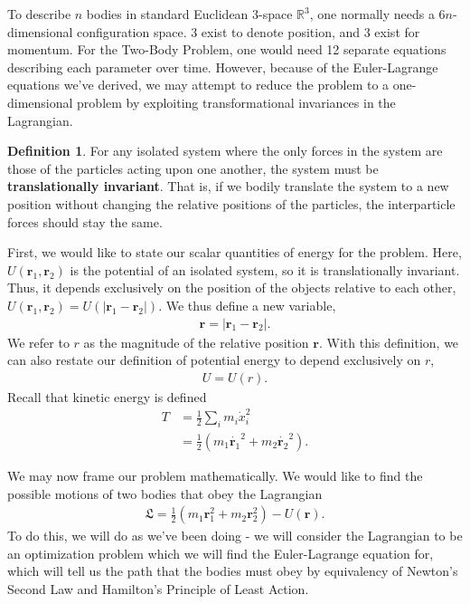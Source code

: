 \documentclass[10pt, psamsfonts]{amsart}
\theoremstyle{definition}
\newtheorem{defn}[thm]{Definition}
\theoremstyle{remark}
\numberwithin{equation}{section}
\begin{document}
To describe $n$ bodies in standard Euclidean 3-space $\mathbb{R}^3$, one normally needs a $6n$-dimensional configuration space. 3 exist to denote position, and 3 exist for momentum. For the Two-Body Problem, one would need 12 separate equations describing each parameter over time. However, because of the Euler-Lagrange equations we've derived, we may attempt to reduce the problem to a one-dimensional problem by exploiting transformational invariances in the Lagrangian.

\begin{defn}
  For any isolated system where the only forces in the system are those of the particles acting upon one another, the system must be \textbf{translationally invariant}. That is, if we bodily translate the system to a new position without changing the relative positions of the particles, the interparticle forces should stay the same.
\end{defn}

First, we would like to state our scalar quantities of energy for the problem. Here, $U(\bm{r}_1, \bm{r}_2)$ is the potential of an isolated system, so it is translationally invariant. Thus, it depends exclusively on the position of the objects relative to each other, $U(\bm{r}_1, \bm{r}_2) = U(|\bm{r}_1 - \bm{r}_2|) $. We thus define a new variable,
\begin{align*}
  \bm{r} = |\bm{r}_1 - \bm{r}_2|.
\end{align*}
We refer to $r$ as the magnitude of the relative position $\bm{r}$. With this definition, we can also restate our definition of potential energy to depend exclusively on $r$,
\begin{align*}
  U = U(r).
\end{align*}
Recall that kinetic energy is defined 
\begin{align*}
  T &= \frac{1}{2} \sum_i  m_i \dot{x}_i^2 \\
    &= \frac{1}{2} (m_1 \dot{\bm{r}_1}^2 + m_2 \dot{\bm{r}_2}^2).
\end{align*}

We may now frame our problem mathematically. We would like to find the possible motions of two bodies that obey the Lagrangian
\begin{gather*}
  \mathfrak{L} = \frac{1}{2} (m_1 \bm{r}_1^2 + m_2 \bm{r}_2^2) - U(\bm{r}).
\end{gather*}
To do this, we will do as we've been doing - we will consider the Lagrangian to be an optimization problem which we will find the Euler-Lagrange equation for, which will tell us the path that the bodies must obey by equivalency of Newton's Second Law and Hamilton's Principle of Least Action.
\end{document}
